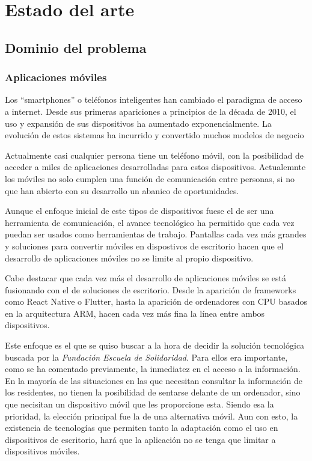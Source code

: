 \chapter{Estado del arte}

\section{Dominio del problema}

\subsection{Aplicaciones móviles}

Los ``smartphones'' o teléfonos inteligentes han cambiado el paradigma de acceso a internet. Desde sus primeras apariciones a principios de la década de 2010, el uso y expansión de sus dispositivos ha aumentado exponencialmente. La evolución de estos sistemas ha incurrido y convertido muchos modelos de negocio

Actualmente casi cualquier persona tiene un teléfono móvil, con la posibilidad de acceder a miles de aplicaciones desarrolladas para estos dispositivos. Actualemnte los móviles no solo cumplen una función de comunicación entre personas, si no que han abierto con su desarrollo un abanico de oportunidades.

Aunque el enfoque inicial de este tipos de dispositivos fuese el de ser una herramienta de comunicación, el avance tecnológico ha permitido que cada vez puedan ser usados como herramientas de trabajo. Pantallas cada vez más grandes y soluciones para convertir móviles en dispostivos de escritorio hacen que el desarrollo de aplicaciones móviles no se limite al propio dispositivo. 

Cabe destacar que cada vez más el desarrollo de aplicaciones móviles se está fusionando con el de soluciones de escritorio. Desde la aparición de frameworks como React Native o Flutter, hasta la aparición de ordenadores con CPU basados en la arquitectura ARM, hacen cada vez más fina la línea entre ambos dispositivos. 

Este enfoque es el que se quiso buscar a la hora de decidir la solución tecnológica buscada por la \textit{Fundación Escuela de Solidaridad}. Para ellos era importante, como se ha comentado previamente, la inmediatez en el acceso a la información. En la mayoría de las situaciones en las que necesitan consultar la información de los residentes, no tienen la posibilidad de sentarse delante de un ordenador, sino que necisitan un dispositivo móvil que les proporcione esta. Siendo esa la prioridad, la elección principal fue la de una alternativa móvil. Aun con esto, la existencia de tecnologías que permiten tanto la adaptación como el uso en dispositivos de escritorio, hará que la aplicación no se tenga que limitar a dispositivos móviles.

